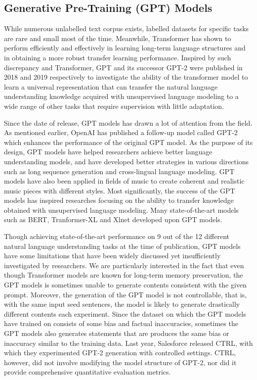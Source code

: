 \documentclass{article}
\begin{document}
\subsection{Generative Pre-Training (GPT) Models}
While numerous unlabelled text corpus exists, labelled datasets for specific tasks are rare and small most of the time. Meanwhile, Transformer\cite{transformer} has shown to perform efficiently and effectively in learning long-term language structures and in obtaining a more robust transfer learning performance. Inspired by such discrepancy and Transformer, GPT\cite{gpt} and its successor GPT-2\cite{gpt2} were published in 2018 and 2019 respectively to investigate the ability of the transformer model to learn a universal representation that can transfer the natural language understanding knowledge acquired with unsupervised language modeling to a wide range of other tasks that require supervision with little adaptation.

Since the date of release, GPT models has drawn a lot of attention from the field. As mentioned earlier, OpenAI has published a follow-up model called GPT-2 which enhances the performance of the original GPT model. As the purpose of its design, GPT models have helped researchers achieve better language understanding models, and have developed better strategies in various directions such as long sequence generation\cite{sparsetransformer} and cross-lingual language modeling\cite{crosslingual}. GPT models have also been applied in fields of music to create coherent and realistic music pieces with different styles. Most significantly, the success of the GPT models has inspired researches focusing on the ability to transfer knowledge obtained with unsupervised language modeling. Many state-of-the-art models such as BERT\cite{bert}, Tranformer-XL\cite{transformerxl} and Xlnet\cite{xlnet} developed upon GPT models.

Though achieving state-of-the-art performance on 9 out of the 12 different natural language understanding tasks at the time of publication, GPT models have some limitations that have been widely discussed\cite{github} yet insufficiently investigated by researchers. We are particularly interested in the fact that even though Transformer models are known for long-term memory preservation, the GPT models is sometimes unable to generate contents consistent with the given prompt. Moreover, the generation of the GPT model is not controllable, that is, with the same input seed sentences, the model is likely to generate drastically different contents each experiment. Since the dataset on which the GPT models have trained on consists of some bias and factual inaccuracies, sometimes the GPT models also generates statements that are produces the same bias or inaccuracy similar to the training data. Last year, Salesforce released CTRL\cite{ctrl}, with which they experimented GPT-2 generation with controlled settings. CTRL, however, did not involve modifying the model structure of GPT-2, nor did it provide comprehensive quantitative evaluation metrics.
\end{document}

